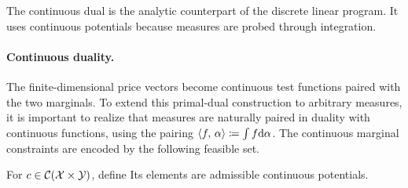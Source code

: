 The continuous dual is the analytic counterpart of the discrete linear program. It uses continuous potentials because measures are probed through integration.

\paragraph{Continuous duality.}
The finite-dimensional price vectors become continuous test functions paired with the two marginals.
To extend this primal-dual construction to arbitrary measures, it is important to realize that measures are naturally paired in duality with continuous functions, using the pairing $\langle f,\,\alpha\rangle \coloneqq \int f \mathrm{d} \alpha$.
The continuous marginal constraints are encoded by the following feasible set.
\begin{defn}\label{def-continuous-admissible-potentials}
	For $c\in\mathcal{C}(\mathcal{X}\times\mathcal{Y})$, define
	Its elements are admissible continuous potentials.
\end{defn}

